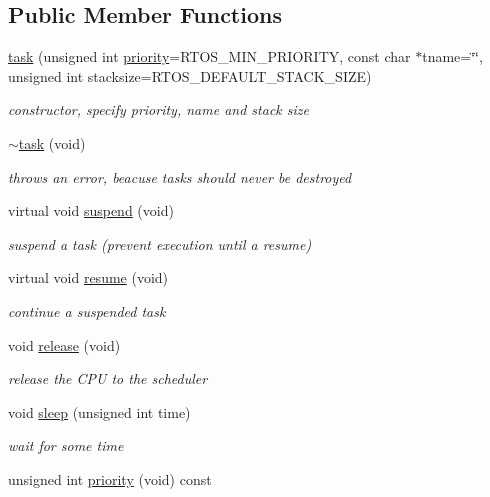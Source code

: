 \subsection*{Public Member Functions}
\begin{DoxyCompactItemize}
\item 
\hyperlink{class_r_t_o_s_1_1task_a2a6ca33f9fb074225304f29561c5d826}{task} (unsigned int \hyperlink{class_r_t_o_s_1_1task_ac5a30dff650f3b714491509cabad5dff}{priority}=R\+T\+O\+S\+\_\+\+M\+I\+N\+\_\+\+P\+R\+I\+O\+R\+I\+TY, const char $\ast$tname=\char`\"{}\char`\"{}, unsigned int stacksize=R\+T\+O\+S\+\_\+\+D\+E\+F\+A\+U\+L\+T\+\_\+\+S\+T\+A\+C\+K\+\_\+\+S\+I\+ZE)
\begin{DoxyCompactList}\small\item\em constructor, specify priority, name and stack size \end{DoxyCompactList}\item 
\hyperlink{class_r_t_o_s_1_1task_a5035326ddaf51d9219a17ca6c5a23c83}{$\sim$task} (void)\hypertarget{class_r_t_o_s_1_1task_a5035326ddaf51d9219a17ca6c5a23c83}{}\label{class_r_t_o_s_1_1task_a5035326ddaf51d9219a17ca6c5a23c83}

\begin{DoxyCompactList}\small\item\em throws an error, beacuse tasks should never be destroyed \end{DoxyCompactList}\item 
virtual void \hyperlink{class_r_t_o_s_1_1task_a2e0e3c92d9479336535a2ef877103f36}{suspend} (void)
\begin{DoxyCompactList}\small\item\em suspend a task (prevent execution until a resume) \end{DoxyCompactList}\item 
virtual void \hyperlink{class_r_t_o_s_1_1task_a841b14aaab18d883959f034510dd9376}{resume} (void)
\begin{DoxyCompactList}\small\item\em continue a suspended task \end{DoxyCompactList}\item 
void \hyperlink{class_r_t_o_s_1_1task_aa3eec7220a2724d30e2156cc395035f2}{release} (void)
\begin{DoxyCompactList}\small\item\em release the C\+PU to the scheduler \end{DoxyCompactList}\item 
void \hyperlink{class_r_t_o_s_1_1task_a9d639b6f1147e0e3dbc603cdd8c52bd4}{sleep} (unsigned int time)
\begin{DoxyCompactList}\small\item\em wait for some time \end{DoxyCompactList}\item 
unsigned int \hyperlink{class_r_t_o_s_1_1task_ac5a30dff650f3b714491509cabad5dff}{priority} (void) const \hypertarget{class_r_t_o_s_1_1task_ac5a30dff650f3b714491509cabad5dff}{}\label{class_r_t_o_s_1_1task_ac5a30dff650f3b714491509cabad5dff}


\end{DoxyCompactItemize}
